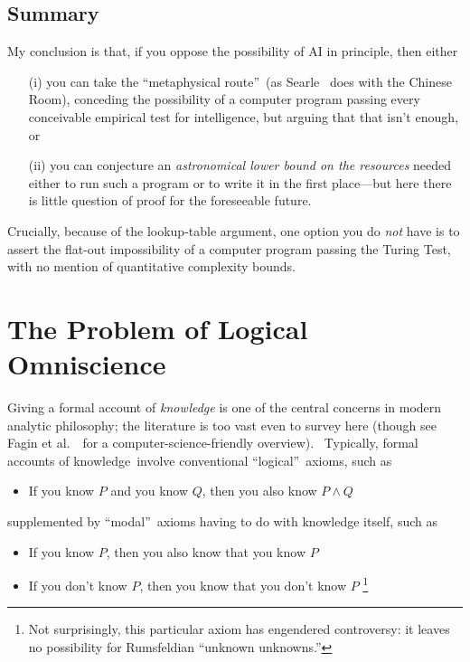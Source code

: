 \documentclass[12pt,onecolumn]{article}%
\begin{document}
\subsection{Summary}

My conclusion is that, if you oppose the possibility of AI in principle, then either

\begin{enumerate}
\item[(i)] you can take the \textquotedblleft metaphysical
route\textquotedblright\ (as Searle \cite{searle}\ does with the Chinese
Room), conceding the possibility of a computer program passing every
conceivable empirical test for intelligence, but arguing that that isn't
enough, or

\item[(ii)] you can conjecture an \textit{astronomical lower bound on the
resources} needed either to run such a program or to write it in the first
place---but here there is little question of proof for the foreseeable future.
\end{enumerate}

\noindent Crucially, because of the lookup-table argument, one option you do
\textit{not} have is to assert the flat-out impossibility of a computer
program passing the Turing Test, with no mention of quantitative complexity bounds.

\section{The Problem of Logical Omniscience\label{OMNI}}

Giving a formal account of \textit{knowledge} is one of the central concerns
in modern analytic philosophy; the literature is too vast even to survey here
(though see Fagin et al.\ \cite{fhmv}\ for a computer-science-friendly
overview). \ Typically, formal accounts of knowledge\ involve conventional
\textquotedblleft logical\textquotedblright\ axioms, such as

\begin{itemize}
\item If you know $P$ and you know $Q$, then you also know $P\wedge Q$
\end{itemize}

\noindent supplemented by \textquotedblleft modal\textquotedblright\ axioms
having to do with knowledge itself, such as

\begin{itemize}
\item If you know $P$, then you also know that you know $P$

\item If you don't know $P$, then you know that you don't know $P$%
\footnote{Not surprisingly, this particular axiom has engendered controversy:
it leaves no possibility for Rumsfeldian \textquotedblleft unknown
unknowns.\textquotedblright}
\end{itemize}
\end{document}
